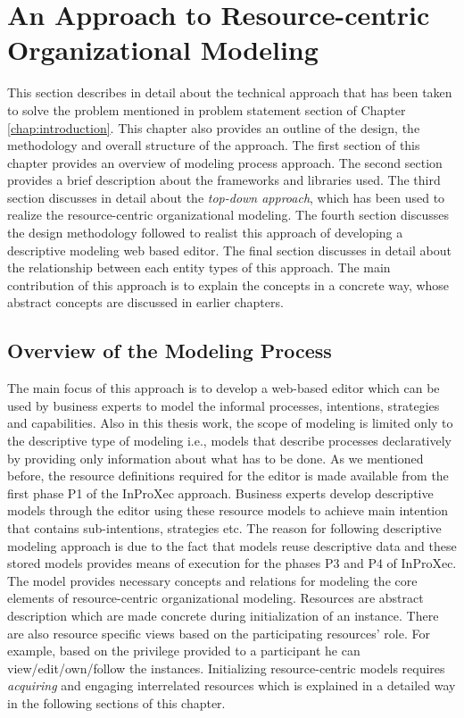 \chapter{An Approach to Resource-centric Organizational Modeling}
\label{chap:approach}
This section describes in detail about the technical approach that has been taken to solve the problem mentioned in problem statement section of Chapter \ref{chap:introduction}. This chapter also provides an outline of the design, the methodology and overall structure of the approach. The first section of this chapter provides an overview of modeling process approach. The second section  provides a brief description about the frameworks and libraries used. The third section discusses in detail about the \textit{top-down approach}, which has been used to realize the resource-centric organizational modeling. The fourth section discusses the design methodology followed to realist this approach of developing a descriptive modeling web based editor. The final section discusses in detail about the relationship between each entity types of this approach. The main contribution of this approach is to explain the concepts in a concrete way, whose abstract concepts are discussed in earlier chapters.

\section{Overview of the Modeling Process}
\label{sec:overviewmodelingprocess}
The main focus of this approach is to develop a web-based editor which can be used by business experts to model the informal processes, intentions, strategies and capabilities. Also in this thesis work, the scope of modeling is limited only to the descriptive type of modeling i.e., models that describe processes declaratively by providing only information about what has to be done. As we mentioned before, the resource definitions required for the editor is made available from the first phase P1 of the InProXec approach. Business experts develop descriptive models through the editor using these resource models to achieve main intention that contains sub-intentions, strategies etc. The reason for following descriptive modeling approach is due to the fact that models reuse descriptive data and these stored models provides means of execution for the phases P3 and P4 of InProXec. The model provides necessary concepts and relations for modeling the core elements of resource-centric organizational modeling. Resources are abstract description which are made concrete during initialization of an instance. There are also resource specific views based on the participating resources' role. For example, based on the privilege provided to a participant he can view/edit/own/follow the instances. Initializing resource-centric models requires \textit{acquiring} and engaging interrelated resources \cite{Sungur2015} which is explained in a detailed way in the following sections of this chapter. 


